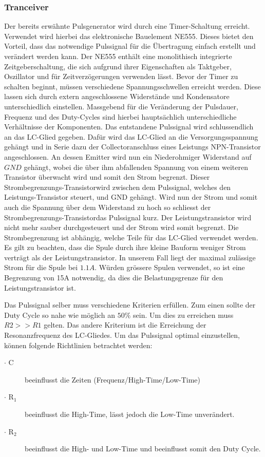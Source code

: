 \subsubsection*{Tranceiver}
Der bereits erwähnte Pulsgenerator wird durch eine Timer-Schaltung erreicht. Verwendet wird hierbei das elektronische Bauelement NE555. Dieses bietet den Vorteil, dass das notwendige Pulssignal für die Übertragung einfach erstellt und verändert werden kann. Der NE555 enthält eine monolithisch integrierte Zeitgeberschaltung, die sich aufgrund ihrer Eigenschaften als Taktgeber, Oszillator und für Zeitverzögerungen verwenden lässt. Bevor der Timer zu schalten beginnt, müssen verschiedene Spannungsschwellen erreicht werden. Diese lassen sich durch extern angeschlossene Widerstände und Kondensatore unterschiedlich einstellen. Massgebend für die Veränderung der Pulsdauer, Frequenz und des Duty-Cycles sind hierbei hauptsächlich unterschiedliche Verhältnisse der Komponenten. Das entstandene Pulssignal wird schlussendlich an das LC-Glied gegeben. Dafür wird das LC-Glied an die Versorgungsspannung gehängt und in Serie dazu der Collectoranschluss eines Leistungs NPN-Transistor angeschlossen. An dessen Emitter wird nun ein Niederohmiger Widerstand auf $GND$ gehängt, wobei die über ihm abfallenden Spannung von einem weiteren Transistor überwacht wird und somit den Strom begrenzt. Dieser \glqq Strombegrenzungs-Transistor\grqq wird zwischen dem Pulssignal, welches den Leistungs-Transistor steuert, und GND gehängt. Wird nun der Strom und somit auch die Spannung über dem Widerstand zu hoch so schliesst der \glqq Strombegrenzungs-Transistor\grqq das Pulssignal kurz. Der Leistungstransistor wird nicht mehr sauber durchgesteuert und der Strom wird somit begrenzt. Die Strombegrenzung ist abhängig, welche Teile für das LC-Glied verwendet werden. Es gilt zu beachten, dass die Spule durch ihre kleine Bauform weniger Strom verträgt als der Leistungstransistor. In unserem Fall liegt der maximal zulässige Strom für die Spule bei $1.1A$. Würden grössere Spulen verwendet, so ist eine Begrenzung von 15A notwendig, da dies die Belastungsgrenze für den Leistungstransistor ist.
 
Das Pulssignal selber muss verschiedene Kriterien erfüllen. Zum einen sollte der Duty Cycle so nahe wie möglich an $50\%$ sein. Um dies zu erreichen muss $R2 >> R1$ gelten. Das andere Kriterium ist die Erreichung der Resonanzfrequenz des LC-Gliedes. Um das Pulssignal optimal einzustellen, können folgende Richtlinien betrachtet werden:
\begin{description}
	\item [$\cdot$ C] beeinflusst die Zeiten (Frequenz/High-Time/Low-Time)
	\item [$\cdot$ R$_{1}$] beeinflusst die High-Time, lässt jedoch die Low-Time unverändert.
	\item [$\cdot$ R$_{2}$ ] beeinflusst die High- und Low-Time und beeinflusst somit den Duty Cycle.
\end{description}

